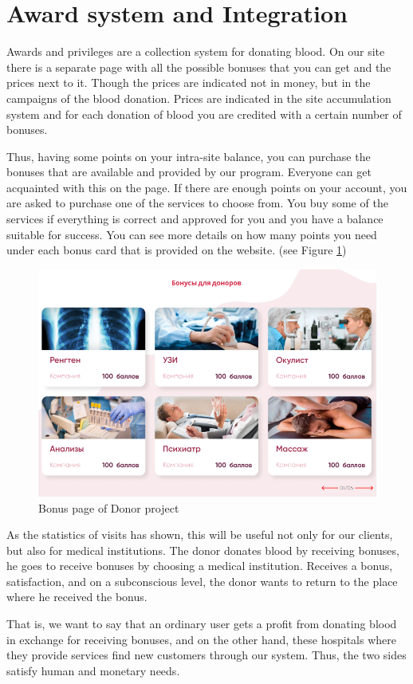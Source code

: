 \section{Award system and Integration}
Awards and privileges are a collection system for donating blood. On our site there is a separate page with all the possible bonuses that you can get and the prices next to it. Though the prices are indicated not in money, but in the campaigns of the blood donation. Prices are indicated in the site accumulation system and for each donation of blood you are credited with a certain number of bonuses. 
\par
Thus, having some points on your intra-site balance, you can purchase the bonuses that are available and provided by our program. Everyone can get acquainted with this on the page. If there are enough points on your account, you are asked to purchase one of the services to choose from. You buy some of the services if everything is correct and approved for you and you have a balance suitable for success. You can see more details on how many points you need under each bonus card that is provided on the website.
(see Figure \ref{fig:bonuses})

\begin{figure}[h]
    \centering
    \includegraphics[scale=0.5]{figures/8.png}
    \caption{Bonus page of Donor project}
    \label{fig:bonuses}
\end{figure}
\par
As the statistics of visits has shown, this will be useful not only for our clients, but also for medical institutions. The donor donates blood by receiving bonuses, he goes to receive bonuses by choosing a medical institution. Receives a bonus, satisfaction, and on a subconscious level, the donor wants to return to the place where he received the bonus. 
\par
That is, we want to say that an ordinary user gets a profit from donating blood in exchange for receiving bonuses, and on the other hand, these hospitals where they provide services find new customers through our system. Thus, the two sides satisfy human and monetary needs.

